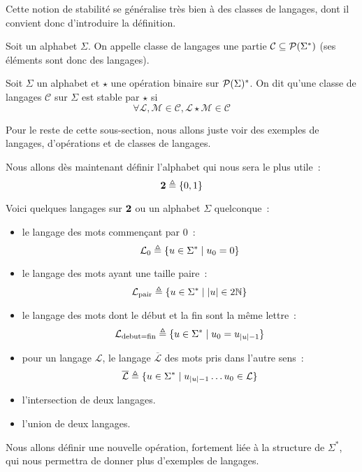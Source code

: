 Cette notion de stabilité se généralise très bien à des classes de langages,
dont il convient donc d'introduire la définition.

\begin{definition}
  Soit un alphabet $\Sigma$. On appelle classe de langages une partie
  $\mathcal C\subseteq \mathcal{P}(\Sigma^*)$ (ses éléments sont donc des
  langages).
\end{definition}

\begin{definition}
  Soit $\Sigma$ un alphabet et $\star$ une opération binaire sur
  $\mathcal{P}(\Sigma)^*$. On dit qu'une classe de langages $\mathcal C$ sur
  $\Sigma$ est stable par $\star$ si
  \[\forall \mathcal L,\mathcal M\in\mathcal C,
  \mathcal L\star \mathcal M\in\mathcal C\]
\end{definition}

Pour le reste de cette sous-section, nous allons juste voir des exemples de
langages, d'opérations et de classes de langages.

\begin{example}
  Nous allons dès maintenant définir l'alphabet qui nous sera le plus utile~:
  \[\boldsymbol{2} \triangleq \{0,1\}\]

  Voici quelques langages sur $\boldsymbol{2}$ ou un alphabet $\Sigma$ quelconque~:
  \begin{itemize}
  \item le langage des mots commençant par $0$~:
    \[\mathcal L_0 \triangleq \{u\in\Sigma^*\mid u_0 = 0\}\]
  \item le langage des mots ayant une taille paire~:
    \[\mathcal L_{\mathrm{pair}} \triangleq \{u\in\Sigma^*\mid |u|\in2\mathbb N\}\]
  \item le langage des mots dont le début et la fin sont la même lettre~:
    \[\mathcal L_{\mathrm{debut}=\mathrm{fin}}\triangleq
    \{u\in\Sigma^*\mid u_0 = u_{|u| - 1}\}\]
  \item pour un langage $\mathcal L$, le langage $\overline{\mathcal L}$ des
    mots pris dans l'autre sens~:
    \[\overline{\mathcal L}\triangleq
    \{u\in\Sigma^*\mid u_{|u|-1}\ldots u_0 \in \mathcal L\}\]
  \item l'intersection de deux langages.
  \item l'union de deux langages.
  \end{itemize}
\end{example}

Nous allons définir une nouvelle opération, fortement liée à la structure de
$\Sigma^*$, qui nous permettra de donner plus d'exemples de langages.

